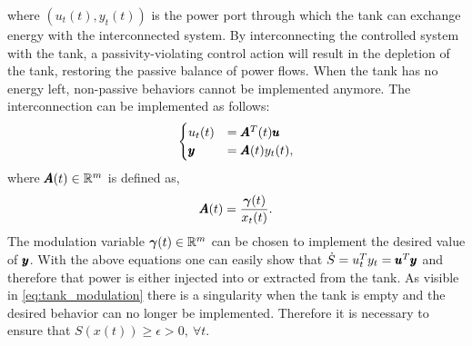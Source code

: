 where $(u_t(t), y_t(t))$ is the power port through which the tank can exchange energy with the interconnected system. By interconnecting the controlled system with the tank, a passivity-violating control action will result in the depletion of the tank, restoring the passive balance of power flows. When the tank has no energy left, non-passive behaviors cannot be implemented anymore. The interconnection can be implemented as follows:
\begin{equation}
\begin{cases}
    u_t(t) &= \pmb{A}^T(t) \pmb{u} \\
    \pmb{y} &= \pmb{A}(t) y_t(t),
\end{cases}
\end{equation}
where $\pmb{A}(t) \in \mathbb{R}^{m}$ is defined as,
\begin{equation} \label{eq:tank_modulation}
    \pmb{A}(t) = \frac{\boldsymbol{\gamma}(t)}{x_t(t)}.
\end{equation}
The modulation variable $\boldsymbol{\gamma}(t) \in \mathbb{R}^{m}$ can be chosen to implement the desired value of $\pmb{y}$. With the above equations one can easily show that $\dot{S} = u_t^T y_t = \pmb{u}^T \pmb{y}$ and therefore that power is either injected into or extracted from the tank. As visible in \eqref{eq:tank_modulation} there is a singularity when the tank is empty and the desired behavior can no longer be implemented. 
Therefore it is necessary to ensure that $S(x(t)) \geq \epsilon > 0, \ \forall t$.